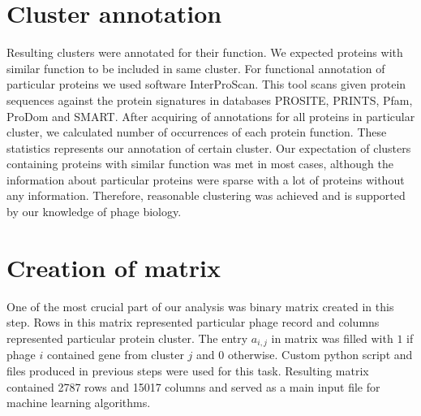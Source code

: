 \section{Cluster annotation}
Resulting clusters were annotated for their function.
We expected proteins with similar function to be included in same cluster.
For functional annotation of particular proteins we used software InterProScan\cite{interpro}.
This tool scans given protein sequences against the protein signatures in databases PROSITE\cite{prosite}, PRINTS\cite{prints}, Pfam\cite{pfam}, ProDom\cite{prodom} and SMART\cite{smart}.
After acquiring of annotations for all proteins in particular cluster, we calculated number of occurrences of each protein function.
These statistics represents our annotation of certain cluster.
Our expectation of clusters containing proteins with similar function was met in most cases, although the information about particular proteins were sparse with a lot of proteins without any information.
Therefore, reasonable clustering was achieved and is supported by our knowledge of phage biology.

\section{Creation of matrix}
One of the most crucial part of our analysis was binary matrix created in this step.
Rows in this matrix represented particular phage record and columns represented particular protein cluster.
The entry $a_{i,j}$ in matrix was filled with $1$ if phage $i$ contained gene from cluster $j$ and $0$ otherwise.
Custom python script and files produced in previous steps were used for this task.
Resulting matrix contained 2787 rows and 15017 columns and served as a main input file for machine learning algorithms.


